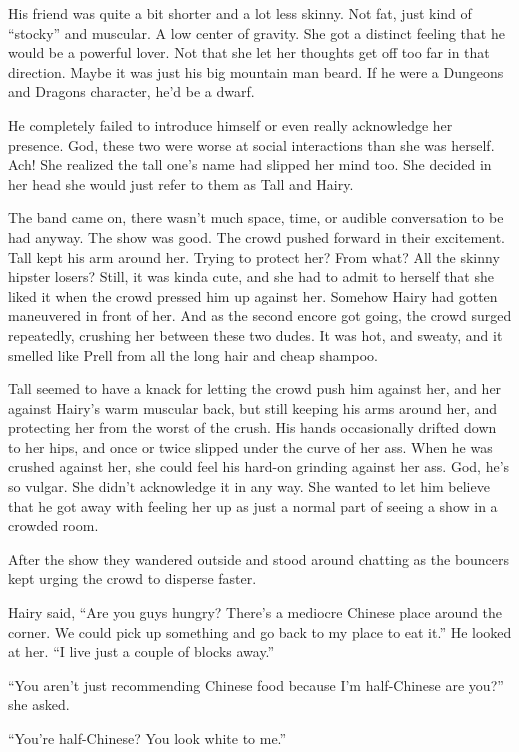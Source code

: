\documentclass[letterpaper]{article}
\begin{document}
His friend was quite a bit shorter and a lot less skinny.
Not fat, just kind of ``stocky'' and muscular.
A low center of gravity. She got a distinct feeling that he would be a powerful lover.
Not that she let her thoughts get off too far in that direction.
Maybe it was just his big mountain man beard.
If he were a Dungeons and Dragons character, he'd be a dwarf.

He completely failed to introduce himself or even really acknowledge her presence. God, these two were worse at social interactions than she was herself. Ach!
She realized the tall one's name had slipped her mind too.
She decided in her head she would just refer to them as Tall and Hairy.

The band came on, there wasn't much space, time, or audible conversation to be had anyway.
The show was good. The crowd pushed forward in their excitement.
Tall kept his arm around her. 
Trying to protect her? From what? All the skinny hipster losers?
Still, it was kinda cute, and she had to admit to herself that she liked it when the crowd pressed him up against her.
Somehow Hairy had gotten maneuvered in front of her.
And as the second encore got going, the crowd surged repeatedly, crushing her between these two dudes. It was hot, and sweaty, and it smelled like Prell from all the long hair and cheap shampoo.

Tall seemed to have a knack for letting the crowd push him against her, and her against Hairy's warm muscular back, but still keeping his arms around her, and protecting her from the worst of the crush. 
His hands occasionally drifted down to her hips, and once or twice slipped under the curve of her ass. 
When he was crushed against her, she could feel his hard-on grinding against her ass.
God, he's so vulgar.
She didn't acknowledge it in any way. 
She wanted to let him believe that he got away with feeling her up as just a normal part of seeing a show in a crowded room.

After the show they wandered outside and stood around chatting as the bouncers kept urging the crowd to disperse faster.

Hairy said, ``Are you guys hungry? There's a mediocre Chinese place around the corner. We could pick up something and go back to my place to eat it.'' He looked at her.
``I live just a couple of blocks away.''

``You aren't just recommending Chinese food because I'm half-Chinese are you?'' she asked.

``You're half-Chinese? You look white to me.''
\end{document}
